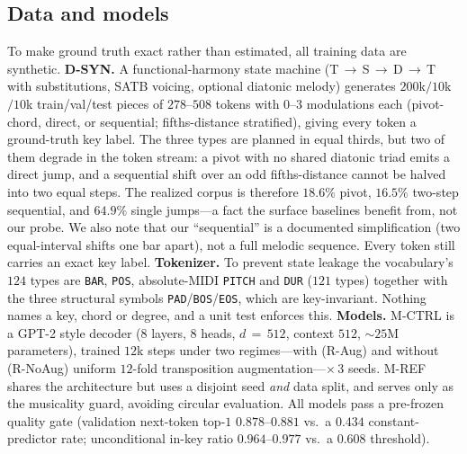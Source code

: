 \documentclass[conference]{IEEEtran}
\makeatletter
\newcommand{\vs}{vs.\@\ }
\makeatother
\begin{document}
\subsection{Data and models}
To make ground truth exact rather than estimated, all training data are
synthetic. \textbf{D-SYN.} A functional-harmony state machine
(T\,$\to$\,S\,$\to$\,D\,$\to$\,T with substitutions, SATB voicing, optional
diatonic melody) generates $200$k$/10$k$/10$k train/val/test pieces of
$278$--$508$ tokens with $0$--$3$ modulations each (pivot-chord, direct, or
sequential; fifths-distance stratified), giving every token a ground-truth key
label. The three types are planned in equal thirds, but two of them degrade in the
token stream: a pivot with no shared diatonic triad emits a direct jump, and a
sequential shift over an odd fifths-distance cannot be halved into two equal steps.
The realized corpus is therefore $18.6\%$ pivot, $16.5\%$ two-step sequential, and
$64.9\%$ single jumps---a fact the surface baselines benefit from, not our probe. We
also note that our ``sequential'' is a documented simplification (two equal-interval
shifts one bar apart), not a full melodic sequence. Every token still carries an exact key
label. \textbf{Tokenizer.} To prevent state leakage the vocabulary's $124$ types are
\texttt{BAR}, \texttt{POS}, absolute-MIDI \texttt{PITCH} and \texttt{DUR} ($121$ types)
together with the three structural symbols \texttt{PAD}/\texttt{BOS}/\texttt{EOS}, which
are key-invariant. Nothing names a key, chord or degree, and a unit test enforces this.
\textbf{Models.} M-CTRL is a GPT-2 style decoder ($8$ layers, $8$ heads,
$d\,{=}\,512$, context $512$, ${\sim}25$M parameters), trained $12$k steps under
two regimes---with (R-Aug) and without (R-NoAug) uniform $12$-fold transposition
augmentation---$\times\,3$ seeds. M-REF shares the architecture but uses a
disjoint seed \emph{and} data split, and serves only as the musicality guard,
avoiding circular evaluation. All models pass a pre-frozen quality gate
(validation next-token top-$1$ $0.878$--$0.881$ \vs a $0.434$ constant-predictor
rate; unconditional in-key ratio $0.964$--$0.977$ \vs a $0.608$ threshold).
\end{document}
